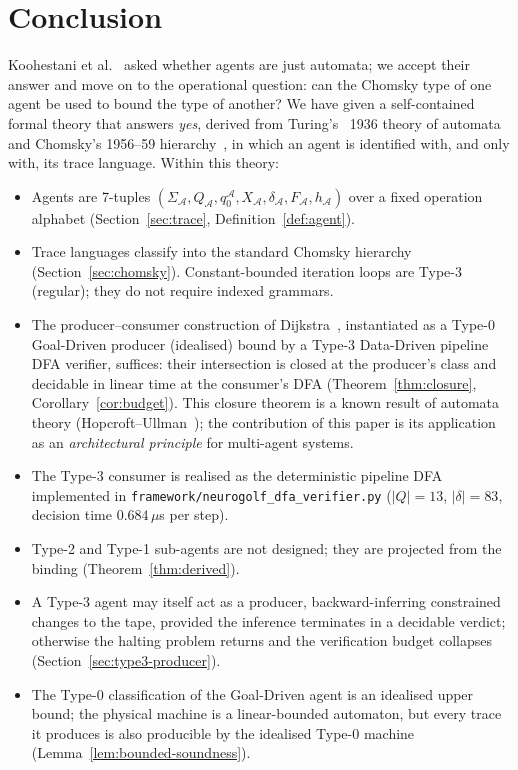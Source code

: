 \section{Conclusion}
\label{sec:conclusion}

Koohestani et al.~\cite{koohestani2025automata} asked whether
agents are just automata; we accept their answer and move on to
the operational question: can the Chomsky type of one agent be
used to bound the type of another?  We have given a self-contained
formal theory that answers \emph{yes}, derived from
Turing's~\cite{turing1936computable} 1936 theory of automata and
Chomsky's 1956--59 hierarchy~\cite{chomsky1956three,
chomsky1959certain}, in which an agent is identified with, and
only with, its trace language.  Within this theory:
\begin{itemize}
\item Agents are 7-tuples
$(\Sigma_\mathcal{A},Q_\mathcal{A},q_0^\mathcal{A},X_\mathcal{A},
\delta_\mathcal{A},F_\mathcal{A},h_\mathcal{A})$ over a fixed
operation alphabet
(Section~\ref{sec:trace}, Definition~\ref{def:agent}).
\item Trace languages classify into the standard
Chomsky hierarchy (Section~\ref{sec:chomsky}).  Constant-bounded
iteration loops are Type-3 (regular); they do not require indexed
grammars.
\item The producer--consumer construction of
Dijkstra~\cite{dijkstra1968cooperating}, instantiated as a
Type-0 Goal-Driven producer (idealised) bound by a Type-3 Data-Driven
pipeline DFA verifier, suffices: their intersection is closed at the
producer's class and decidable in linear time at the consumer's
DFA (Theorem~\ref{thm:closure}, Corollary~\ref{cor:budget}).
This closure theorem is a known result of automata theory
(Hopcroft--Ullman~\cite{hopcroft2006automata}); the contribution
of this paper is its application as an \emph{architectural
principle} for multi-agent systems.
\item The Type-3 consumer is realised as the deterministic
pipeline DFA implemented in \texttt{framework/neurogolf\_dfa\_verifier.py}
($|Q|=13$, $|\delta|=83$, decision time $0.684\,\mu$s per step).
\item Type-2 and Type-1 sub-agents are not designed; they are
projected from the binding (Theorem~\ref{thm:derived}).
\item A Type-3 agent may itself act as a producer,
backward-inferring constrained changes to the tape, provided the
inference terminates in a decidable verdict; otherwise the
halting problem returns and the verification budget collapses
(Section~\ref{sec:type3-producer}).
\item The Type-0 classification of the Goal-Driven agent is an
idealised upper bound; the physical machine is a linear-bounded
automaton, but every trace it produces is also producible by the
idealised Type-0 machine (Lemma~\ref{lem:bounded-soundness}).
\end{itemize}

